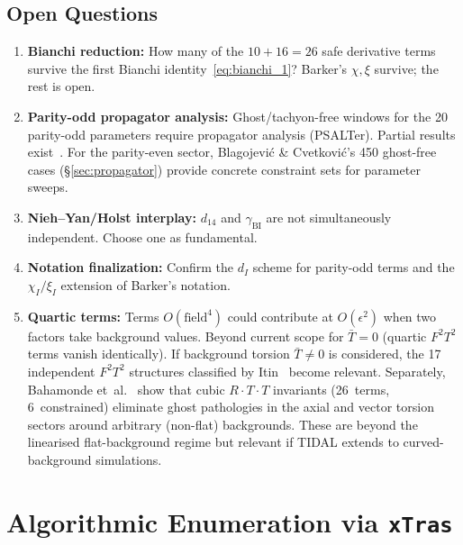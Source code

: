 \documentclass[12pt,a4paper]{article}
\begin{document}
\subsection{Open Questions}

\begin{enumerate}
  \item \textbf{Bianchi reduction:}
    How many of the $10 + 16 = 26$ safe derivative terms survive
    the first Bianchi identity~\eqref{eq:bianchi_1}?
    Barker's $\chi, \xi$ survive; the rest is open.

  \item \textbf{Parity-odd propagator analysis:}
    Ghost/tachyon-free windows for the 20 parity-odd parameters
    require propagator analysis (PSALTer).
    Partial results exist~\cite{Karananas:2014pxa,Blagojevic:2018dpz}.
    For the parity-even sector, Blagojevi\'{c} \& Cvetkovi\'{c}'s
    450 ghost-free cases (\S\ref{sec:propagator}) provide concrete
    constraint sets for parameter sweeps.

  \item \textbf{Nieh--Yan/Holst interplay:}
    $d_{14}$ and $\gamma_{\text{BI}}$ are not simultaneously
    independent. Choose one as fundamental.

  \item \textbf{Notation finalization:}
    Confirm the $d_I$ scheme for parity-odd terms and the
    $\chi_I / \xi_I$ extension of Barker's notation.

  \item \textbf{Quartic terms:}
    Terms $O(\text{field}^4)$ could contribute at $O(\epsilon^2)$ when
    two factors take background values. Beyond current scope for
    $\bar{T} = 0$ (quartic $F^2 T^2$ terms vanish identically).
    If background torsion $\bar{T} \neq 0$ is considered, the 17
    independent $F^2 T^2$ structures classified by
    Itin~\cite{Itin:2003hr} become relevant.
    Separately, Bahamonde et~al.~\cite{Bahamonde:2024sqo} show that
    cubic $R \cdot T \cdot T$ invariants (26~terms, 6~constrained)
    eliminate ghost pathologies in the axial and vector torsion sectors
    around arbitrary (non-flat) backgrounds. These are beyond the
    linearised flat-background regime but relevant if TIDAL extends
    to curved-background simulations.
\end{enumerate}


\appendix
\section{Algorithmic Enumeration via \texttt{xTras}}
\label{sec:algorithm}
\end{document}
